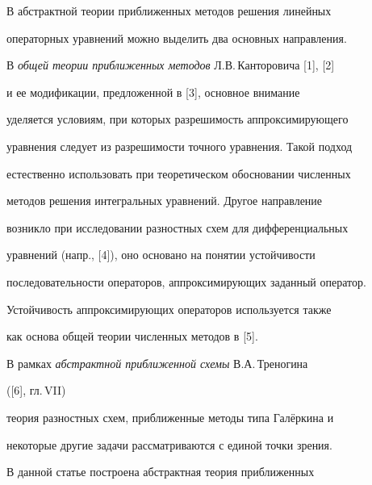 

\pagestyle{plain} %







\maketitle


\label{begin}








В абстрактной теории приближенных методов решения линейных


операторных уравнений можно выделить два основных направления.


В {\it общей теории приближенных методов} Л.В.\,Канторовича [1], [2]


и ее модификации, предложенной в [3], основное внимание


уделяется условиям, при которых разрешимость аппроксимирующего


уравнения следует из разрешимости точного уравнения. Такой подход


естественно использовать при теоретическом обосновании численных


методов решения интегральных уравнений. Другое направление


возникло при исследовании разностных схем для дифференциальных


уравнений (напр., [4]), оно основано на понятии устойчивости


последовательности операторов, аппроксимирующих заданный оператор.


Устойчивость аппроксимирующих операторов используется также


как основа общей теории численных методов в [5].


В рамках {\it абстрактной приближенной схемы} В.А.\,Треногина


([6], гл.\,VII)


теория разностных схем, приближенные методы типа Гал\"еркина и


некоторые другие задачи рассматриваются с единой точки зрения.





В данной статье построена абстрактная теория приближенных


